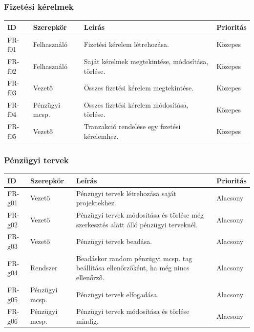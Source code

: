 \documentclass[a4paper,12pt]{article}
\begin{document}
\subsubsection{Fizetési kérelmek}
\begin{table}[H]
  \centering
  \begin{tabular}{llL{8.5cm}l}
  \toprule
  ID & Szerepkör & Leírás & Prioritás \\
  \midrule
  FR-f01 & Felhasználó      & Fizetési kérelem létrehozása.                                                             & Közepes\\
  FR-f02 & Felhasználó      & Saját kérelmek megtekintése, módosítása, törlése.                                         & Közepes\\
  FR-f03 & Vezető           & Összes fizetési kérelem megtekintése.                                                     & Közepes\\
  FR-f04 & Pénzügyi mcsp.   & Összes fizetési kérelem módosítása, törlése.                                              & Közepes\\
  FR-f05 & Vezető           & Tranzakció rendelése egy fizetési kérelemhez.                                             & Közepes\\
  \bottomrule
  \end{tabular}
\end{table}

\subsubsection{Pénzügyi tervek}
\begin{table}[H]
  \centering
  \begin{tabular}{llL{8.5cm}l}
  \toprule
  ID & Szerepkör & Leírás & Prioritás \\
  \midrule
  FR-g01 & Vezető           & Pénzügyi tervek létrehozása saját projektekhez.                                           & Alacsony\\
  FR-g02 & Vezető           & Pénzügyi tervek módosítása és törlése még szerkesztés alatt álló pénzügyi terveknél.      & Alacsony\\
  FR-g03 & Vezető           & Pénzügyi tervek beadása.                                                                  & Alacsony\\
  FR-g04 & Rendszer         & Beadáskor random pénzügyi mcsp. tag beállítása ellenőrzőként, ha még nincs ellenőrző.     & Alacsony\\
  FR-g05 & Pénzügyi mcsp.   & Pénzügyi tervek elfogadása.                                                               & Alacsony\\
  FR-g06 & Pénzügyi mcsp.   & Pénzügyi tervek módosítása és törlése mindig.                                             & Alacsony\\
  \bottomrule
  \end{tabular}
\end{table}
\end{document}
